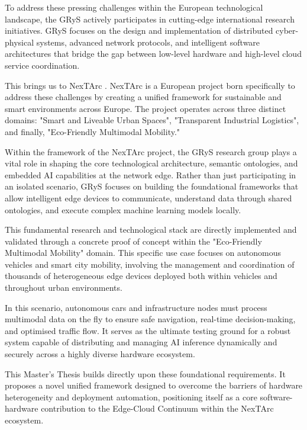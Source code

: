 To address these pressing challenges within the European technological landscape, the \gls{GRyS} \cite{GrupoRedesServicios} actively participates in cutting-edge international research initiatives. \gls{GRyS} focuses on the design and implementation of distributed cyber-physical systems, advanced network protocols, and intelligent software architectures that bridge the gap between low-level hardware and high-level cloud service coordination.

This brings us to NexTArc \cite{NexTArc}. NexTArc is a European project born specifically to address these challenges by creating a unified framework for sustainable and smart environments across Europe. The project operates across three distinct domains: "Smart and Liveable Urban Spaces", "Transparent Industrial Logistics", and finally, "Eco-Friendly Multimodal Mobility." 

Within the framework of the NexTArc project, the \gls{GRyS} research group plays a vital role in shaping the core technological architecture, semantic ontologies, and embedded \gls{AI} capabilities at the network edge. Rather than just participating in an isolated scenario, \gls{GRyS} focuses on building the foundational frameworks that allow intelligent edge devices to communicate, understand data through shared ontologies, and execute complex machine learning models locally. 

This fundamental research and technological stack are directly implemented and validated through a concrete proof of concept within the "Eco-Friendly Multimodal Mobility" domain. This specific use case focuses on autonomous vehicles and smart city mobility, involving the management and coordination of thousands of heterogeneous edge devices deployed both within vehicles and throughout urban environments. 

In this scenario, autonomous cars and infrastructure nodes must process multimodal data on the fly to ensure safe navigation, real-time decision-making, and optimised traffic flow. It serves as the ultimate testing ground for a robust system capable of distributing and managing \gls{AI} inference dynamically and securely across a highly diverse hardware ecosystem.

This Master's Thesis builds directly upon these foundational requirements. It proposes a novel unified framework designed to overcome the barriers of hardware heterogeneity and deployment automation, positioning itself as a core software-hardware contribution to the Edge-Cloud Continuum within the NexTArc ecosystem.


